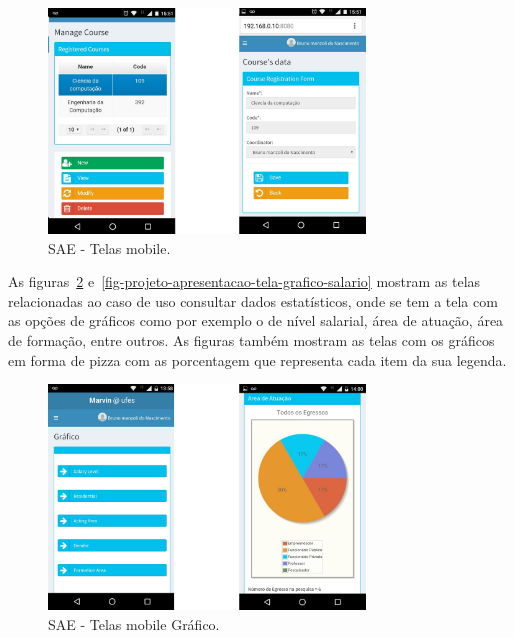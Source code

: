 \begin{figure}[h]
	\centering
	\includegraphics[width=0.75\textwidth]{figuras/projeto/fig-projeto-apresentacao-resposiva-buttons}
	\caption{SAE - Telas mobile.}
	\label{fig-projeto-apresentacao-resposiva-buttons}
\end{figure}


\newpage
As figuras~\ref{fig-projeto-apresentacao-grafico} e~\ref{fig-projeto-apresentacao-tela-grafico-salario} mostram as telas relacionadas ao caso de uso consultar dados estatísticos, onde se tem a tela com as opções de gráficos como por exemplo o de nível salarial, área de atuação, área de formação, entre outros. As figuras também mostram as telas com os gráficos em forma de pizza com as porcentagem que representa cada item da sua legenda.

\begin{figure}[h]
	\centering
	\includegraphics[width=0.75\textwidth]{figuras/projeto/fig-projeto-apresentacao-grafico}
	\caption{SAE - Telas mobile Gráfico.}
	\label{fig-projeto-apresentacao-grafico}
\end{figure}



